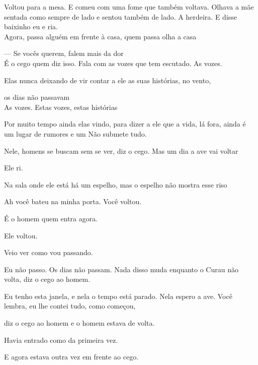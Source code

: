 Voltou para a mesa. E comeu com uma fome que também voltava. Olhava a
mãe sentada como sempre de lado e sentou também de lado. A herdeira. E
disse baixinho eu e ria.\\

Agora, passa alguém em frente à casa, quem passa olha a casa

\breakk

\vspace*{4cm}

--- Se vocês querem, falem mais da dor\\

É o cego quem diz isso. Fala com as vozes que tem escutado. As vozes.

Elas nunca deixando de vir contar a ele as suas histórias, no vento,

os dias não passavam\\

As vozes. Estas vozes, estas histórias

Por muito tempo ainda elas vindo, para dizer a ele que a vida, lá fora,
ainda é um lugar de rumores e um Não submete tudo.

Nele, homens se buscam sem se ver, diz o cego. Mas um dia a ave vai
voltar

Ele ri.

Na sala onde ele está há um espelho, mas o espelho não mostra esse riso

\breakk

\clearpage
\thispagestyle{empty}

\movetooddpage

\vspace*{4cm}

Ah você bateu na minha porta. Você voltou.

É o homem quem entra agora.

Ele voltou.

Veio ver como vou passando.

Eu não passo. Os dias não passam. Nada disso muda enquanto o Curau não
volta, diz o cego ao homem.

Eu tenho esta janela, e nela o tempo está parado. Nela espero a ave.
Você lembra, eu lhe contei tudo, como começou,

diz o cego ao homem e o homem estava de volta.

Havia entrado como da primeira vez.

E agora estava outra vez em frente ao cego.\\

